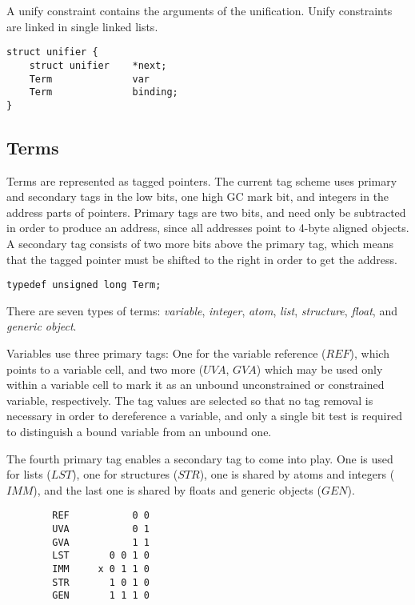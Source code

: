 A unify constraint contains the arguments of the unification. 
Unify constraints are linked in single linked lists.

\begin{verbatim}
struct unifier {
    struct unifier    *next;
    Term              var
    Term              binding;
}
\end{verbatim}

\subsection*{Terms}

Terms are represented as tagged pointers. The current tag scheme uses primary
and secondary tags in the low bits, one high GC mark bit, and integers in the
address parts of pointers. Primary tags are two bits, and need only be subtracted
in order to produce an address, since all addresses point to 4-byte aligned
objects. A secondary tag consists of two more bits above the primary tag,
which means that the tagged pointer must be shifted to the right in order to
get the address.

\begin{verbatim}
typedef unsigned long Term;
\end{verbatim}

There are seven types of terms: {\em variable}, {\em integer}, {\em atom},
{\em list}, {\em structure}, {\em float}, and {\em generic object}.

Variables use three primary tags: One for the variable reference ($REF$),
which points to a variable cell, and two more ($UVA$, $GVA$) which may be
used only within a variable cell to mark it as an unbound unconstrained or
constrained variable, respectively. The tag values are selected so that no tag
removal is necessary in order to dereference a variable, and only a single bit
test is required to distinguish a bound variable from an unbound one.

The fourth primary tag enables a secondary tag to come into play. One is used
for lists ($LST$), one for structures ($STR$), one is shared by atoms and
integers ($IMM$), and the last one is shared by floats and generic objects ($GEN$).


\begin{verbatim}
        REF           0 0
        UVA           0 1
        GVA           1 1
        LST       0 0 1 0
        IMM     x 0 1 1 0
        STR       1 0 1 0
        GEN       1 1 1 0
\end{verbatim}


